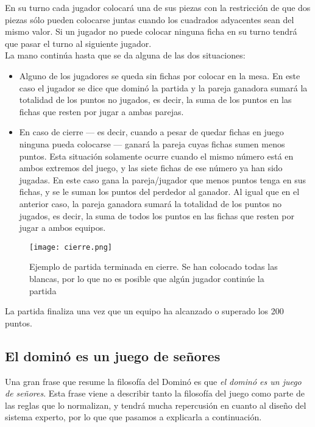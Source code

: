En su turno cada jugador colocará una de sus piezas con la restricción de que dos piezas sólo pueden
colocarse juntas cuando los cuadrados adyacentes sean del mismo valor. Si un jugador no puede colocar
ninguna ficha en su turno tendrá que pasar el turno al siguiente jugador. \\

La mano continúa hasta que se da alguna de las dos situaciones:
\begin{itemize}
    \item Alguno de los jugadores se queda sin fichas por colocar en la mesa. En este caso el jugador se
        dice que dominó la partida y la pareja ganadora sumará la totalidad de los puntos no jugados,
        es decir, la suma de los puntos en las fichas que resten por jugar a ambas parejas.
    \item En caso de cierre --- es decir, cuando a pesar de quedar fichas en juego ninguna pueda colocarse ---
        ganará la pareja cuyas fichas sumen menos puntos. Esta situación solamente ocurre cuando el mismo número
        está en ambos extremos del juego, y las siete fichas de ese número ya han sido jugadas. En este caso
        gana la pareja/jugador que menos puntos tenga en sus fichas, y se le suman los puntos del perdedor al ganador.
        Al igual que en el anterior caso, la pareja ganadora sumará la totalidad de los puntos no jugados,
        es decir, la suma de todos los puntos en las fichas que resten por jugar a ambos equipos.
\end{itemize}

\begin{figure}[h]
  \label{cierre}
  \begin{center}
    \texttt{[image: cierre.png]}
  \end{center}
  \caption{Ejemplo de partida terminada en cierre. Se han colocado todas las blancas, por lo que no es posible
            que algún jugador continúe la partida}
\end{figure}


La partida finaliza una vez que un equipo ha alcanzado o superado los 200 puntos. \\

\subsection{El dominó es un juego de señores}

Una gran frase que resume la filosofía del Dominó es que \emph{el dominó es un juego de señores}. Esta frase
viene a describir tanto la filosofía del juego como parte de las reglas que lo normalizan, y tendrá mucha
repercusión en cuanto al diseño del sistema experto, por lo que que pasamos a explicarla a continuación. \\

